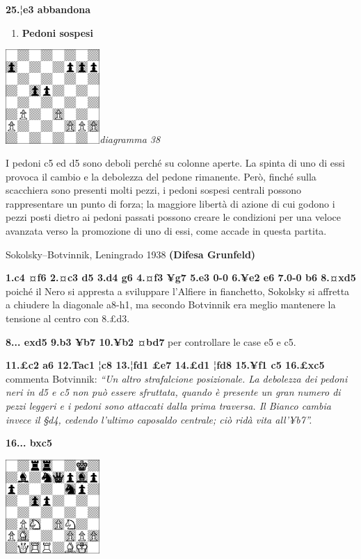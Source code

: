 \documentclass[
]{article}
\begin{document}
\textbf{25.¦e3 abbandona}

\begin{enumerate}
\def\labelenumi{\alph{enumi})}
\setcounter{enumi}{3}
\item
  \textbf{Pedoni sospesi}
\end{enumerate}

\includegraphics[width=1.40972in,height=1.40972in]{vertopal_109f12be458a423d8f3cc838880eaea2/media/image38.png}\emph{diagramma
38}

I pedoni c5 ed d5 sono deboli perché su colonne aperte. La spinta di uno
di essi provoca il cambio e la debolezza del pedone rimanente. Però,
finché sulla scacchiera sono presenti molti pezzi, i pedoni sospesi
centrali possono rappresentare un punto di forza; la maggiore libertà di
azione di cui godono i pezzi posti dietro ai pedoni passati possono
creare le condizioni per una veloce avanzata verso la promozione di uno
di essi, come accade in questa partita.

Sokolsky--Botvinnik, Leningrado 1938 \textbf{(Difesa Grunfeld)}

\textbf{1.c4 ¤f6 2.¤c3 d5 3.d4 g6 4.¤f3 ¥g7 5.e3 0-0 6.¥e2 e6 7.0-0 b6
8.¤xd5} poiché il Nero si appresta a sviluppare l'Alfiere in fianchetto,
Sokolsky si affretta a chiudere la diagonale a8-h1, ma secondo Botvinnik
era meglio mantenere la tensione al centro con 8.£d3.

\textbf{8... exd5 9.b3 ¥b7 10.¥b2 ¤bd7} per controllare le case e5 e c5.

\textbf{11.£c2 a6 12.Tac1 ¦c8 13.¦fd1 £e7 14.£d1 ¦fd8 15.¥f1 c5 16.£xc5}
commenta Botvinnik: \emph{``Un altro strafalcione posizionale. La
debolezza dei pedoni neri in d5 e c5 non può essere sfruttata, quando è
presente un gran numero di pezzi leggeri e i pedoni sono attaccati dalla
prima traversa. Il Bianco cambia invece il §d4, cedendo l'ultimo
caposaldo centrale; ciò ridà vita all'¥b7''.}

\textbf{16... bxc5}

\includegraphics[width=1.40972in,height=1.40972in]{vertopal_109f12be458a423d8f3cc838880eaea2/media/image39.png}
\end{document}
